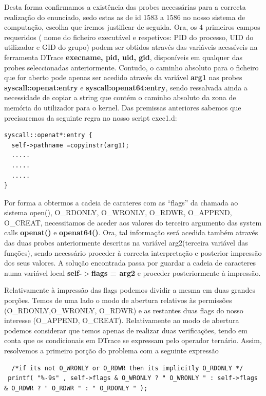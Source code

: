 \documentclass[a4paper]{article}
\begin{document}
Desta forma confirmamos a existência das probes necessárias para a correcta realização do enunciado, sedo estas as de id 1583 a 1586 no nosso sistema de computação, escolha que iremos justificar de seguida.
Ora, os 4 primeiros campos requeridos ( nome do ficheiro executável e respetivos: PID do processo, UID do utilizador e GID do grupo) podem ser obtidos através das variáveis acessíveis na ferramenta DTrace \textbf{execname, pid, uid, gid}, disponíveis em qualquer das probes seleccionadas anteriormente. Contudo, o caminho absoluto para o ficheiro que for aberto pode apenas ser acedido através da variável \textbf{arg1} nas probes  \textbf{syscall::openat:entry} e \textbf{syscall:openat64:entry}, sendo ressalvada ainda a necessidade de copiar a string que contém o caminho absoluto da zona de memória do utilizador para o kernel. Das premissas anteriores sabemos que precisaremos da seguinte regra no nosso script exec1.d:
 \begin{lstlisting}
syscall::openat*:entry {
  self->pathname =copyinstr(arg1);
  .....
  .....
  .....
}
 \end{lstlisting}

Por forma a obtermos a cadeia de carateres com as “flags” da chamada ao sistema open(), O\_RDONLY,
O\_WRONLY, O\_RDWR, O\_APPEND, O\_CREAT, necessitamos de aceder aos valores do terceiro argumento das system calls \textbf{openat()} e \textbf{openat64()}.  Ora, tal informação será acedida também através das duas probes anteriormente descritas na variável arg2(terceira variável das funções), sendo necessário proceder à correcta interpretação e posterior impressão dos seus valores. A solução encontrada passa por guardar a cadeia de caracteres numa variável local \textbf{self-$>$flags = arg2} e proceder posteriormente à impressão. \par 
Relativamente à impressão das flags podemos dividir a mesma em duas grandes porções. Temos de uma lado o modo de abertura relativos às permissões (O\_RDONLY,O\_WRONLY, O\_RDWR) e as restantes duas flags do nosso interesse (O\_APPEND, O\_CREAT). Relativamente ao modo de abertura podemos considerar que temos apenas de realizar duas verificações, tendo em conta que os condicionais em DTrace se expressam pelo operador ternário. Assim, resolvemos a primeiro porção do problema com a seguinte expressão
\begin{lstlisting}
  /*if its not O_WRONLY or O_RDWR then its implicitly O_RDONLY */
 printf( "%-9s" , self->flags & O_WRONLY ? " O_WRONLY " : self->flags & O_RDWR ? " O_RDWR " : " O_RDONLY " ); 
  \end{lstlisting}
  
\end{document}
